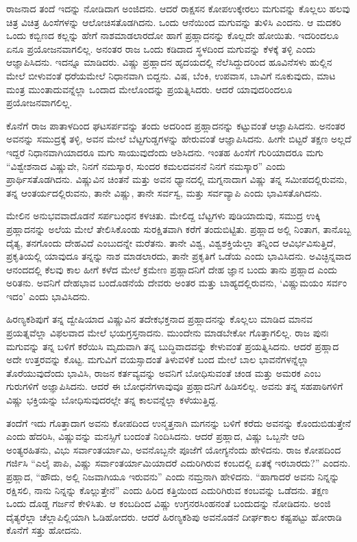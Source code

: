 \vskip 0.3cm

ರಾಜನಾದ ತಂದೆ ಇದನ್ನು ನೋಡಿದಾಗ ಅಂಜಿದನು. ಆದರೆ ರಾಕ್ಷಸನ ಕೋಪ\break ಉಕ್ಕೇರಲು ಮಗುವನ್ನು ಕೊಲ್ಲಲು ಹಲವು ಚಿತ್ರ ವಿಚಿತ್ರ ಹಿಂಸೆಗಳನ್ನು ಆಲೋಚಿಸತೊಡಗಿದನು. ಒಂದು ಆನೆಯಿಂದ ಮಗುವನ್ನು ತುಳಿಸಿ ಎಂದನು. ಆ ಮದಕರಿ ಒಂದು ಕಬ್ಬಿಣದ ಕಲ್ಲನ್ನು ಹೇಗೆ ನಾಶಮಾಡಲಾರದೋ ಹಾಗೆ ಪ್ರಹ್ಲಾದನನ್ನು ಕೊಲ್ಲದೇ ಹೋಯಿತು. ಇದರಿಂದಲೂ ಏನೂ ಪ್ರಯೋಜನವಾಗಲಿಲ್ಲ. ಅನಂತರ ರಾಜ ಒಂದು ಕಡಿದಾದ ಸ್ಥಳದಿಂದ ಮಗುವನ್ನು ಕೆಳಕ್ಕೆ ತಳ್ಳಿ ಎಂದು ಆಜ್ಞಾಪಿಸಿದನು. ಇದನ್ನೂ ಮಾಡಿದರು. ವಿಷ್ಣು ಪ್ರಹ್ಲಾದನ ಹೃದಯದಲ್ಲಿ ನೆಲೆಸಿದ್ದುದರಿಂದ ಹೂವಿನೆಸಳು ಹುಲ್ಲಿನ ಮೇಲೆ ಬೀಳುವಂತೆ ಧರೆಯಮೇಲೆ ನಿಧಾನವಾಗಿ ಬಿದ್ದನು. ವಿಷ, ಬೆಂಕಿ, ಉಪವಾಸ, ಬಾವಿಗೆ ನೂಕುವುದು, ಮಾಟ ಮಂತ್ರ ಮುಂತಾದುವನ್ನೆಲ್ಲಾ ಒಂದಾದ ಮೇಲೊಂದನ್ನು ಪ್ರಯತ್ನಿಸಿದರು. ಆದರೆ ಯಾವುದರಿಂದಲೂ ಪ್ರಯೋಜನವಾಗಲಿಲ್ಲ.

\vskip 0.3cm

ಕೊನೆಗೆ ರಾಜ ಪಾತಾಳದಿಂದ ಘಟಸರ್ಪವನ್ನು ತಂದು ಅದರಿಂದ ಪ್ರಹ್ಲಾದನನ್ನು ಕಟ್ಟುವಂತೆ ಆಜ್ಞಾಪಿಸಿದನು. ಅನಂತರ ಅವನನ್ನು ಸಮುದ್ರಕ್ಕೆ ತಳ್ಳಿ, ಅವನ ಮೇಲೆ ಬೆಟ್ಟಗುಡ್ಡಗಳನ್ನು ಹೇರುವಂತೆ ಆಜ್ಞಾಪಿಸಿದನು. ಹೀಗೇ ಬಿಟ್ಟರೆ ತಕ್ಷಣ ಅಲ್ಲದೆ ಇದ್ದರೆ ನಿಧಾನವಾಗಿಯಾದರೂ ಮಗು ಸಾಯುವುದೆಂದು ಆಶಿಸಿದನು. ಇಂತಹ ಹಿಂಸೆಗೆ ಗುರಿಯಾದರೂ ಮಗು “ವಿಶ್ವೇಶನಾದ ವಿಷ್ಣುವೇ, ನಿನಗೆ ನಮಸ್ಕಾರ, ಸುಂದರ ಕಮಲದವನನೆ ನಿನಗೆ ನಮಸ್ಕಾರ” ಎಂದು ಪ್ರಾರ್ಥಿಸತೊಡಗಿದನು. ವಿಷ್ಣುವಿನ ಚಿಂತನೆ ಮತ್ತು ಅವನ ಧ್ಯಾನದಲ್ಲಿ ಮಗ್ನನಾದಾಗ ವಿಷ್ಣು ತನ್ನ ಸಮೀಪದಲ್ಲಿರುವನು, ತನ್ನ ಆಂತರ್ಯದಲ್ಲಿರುವನು, ತಾನೇ ವಿಷ್ಣು, ತಾನೇ ಸರ್ವಸ್ವ, ಮತ್ತು ಸರ್ವವ್ಯಾಪಿ ಎಂದು ಭಾವಿಸತೊಗಿದನು.

ಮೇಲಿನ ಅನುಭವವಾದೊಡನೆ ಸರ್ಪಬಂಧನ ಕಳಚಿತು. ಮೇಲಿದ್ದ ಬೆಟ್ಟಗಳು ಪುಡಿಯಾದುವು, ಸಮುದ್ರ ಉಕ್ಕಿ ಪ್ರಹ್ಲಾದನನ್ನು ಅಲೆಯ ಮೇಲೆ ತೇಲಿಸಿಕೊಂಡು ಸುರಕ್ಷಿತವಾಗಿ ಕರೆಗೆ ತಂದುಬಿಟ್ಟಿತು. ಪ್ರಹ್ಲಾದ ಅಲ್ಲಿ ನಿಂತಾಗ, ತಾನೊಬ್ಬ ದೈತ್ಯ, ತನಗೊಂದು ದೇಹವಿದೆ ಎಂಬುದನ್ನೇ ಮರೆತನು. ತಾನೇ ವಿಶ್ವ, ವಿಶ್ವಶಕ್ತಿಯೆಲ್ಲಾ ತನ್ನಿಂದ ಆವಿರ್ಭವಿಸುತ್ತಿದೆ, ಪ್ರಕೃತಿಯಲ್ಲಿ ಯಾವುದೂ ತನ್ನನ್ನು ನಾಶ ಮಾಡಲಾರದು, ತಾನೇ ಪ್ರಕೃತಿಗೆ ಒಡೆಯ ಎಂದು ಭಾವಿಸಿದನು. ಅವಿಚ್ಛಿನ್ನವಾದ ಆನಂದದಲ್ಲಿ ಕೆಲವು ಕಾಲ ಹೀಗೆ ಕಳೆದ ಮೇಲೆ ಕ್ರಮೇಣ ಪ್ರಹ್ಲಾದನಿಗೆ ದೇಹ ಜ್ಞಾನ ಬಂದು ತಾನು ಪ್ರಹ್ಲಾದ ಎಂದು ಅರಿತನು. ಅವನಿಗೆ ದೇಹಭಾವ ಬಂದೊಡನೆಯೆ ದೇವರು ಅಂತರ ಮತ್ತು ಬಾಹ್ಯದಲ್ಲಿರುವನು, ‘ವಿಷ್ಣುಮಯಂ ಸರ್ವಂ ಇದಂ’ ಎಂದು ಭಾವಿಸಿದನು.

ಹಿರಣ್ಯಕಶಿಪುಗೆ ತನ್ನ ದ್ವೇಷಿಯಾದ ವಿಷ್ಣುವಿನ ತದೇಕಭಕ್ತನಾದ ಪ್ರಹ್ಲಾದನನ್ನು ಕೊಲ್ಲಲು ಮಾಡಿದ ಮಾನವ ಪ್ರಯತ್ನವೆಲ್ಲಾ ವಿಫಲವಾದ ಮೇಲೆ ಭಯಗ್ರಸ್ತನಾದನು. ಮುಂದೇನು ಮಾಡಬೇಕೋ ಗೊತ್ತಾಗಲಿಲ್ಲ. ರಾಜ ಪುನಃ ಮಗುವನ್ನು ತನ್ನ ಬಳಿಗೆ ಕರೆಯಿಸಿ ಮೃದುವಾಗಿ ತನ್ನ ಬುದ್ಧಿವಾದವನ್ನು ಕೇಳುವಂತೆ ಪ್ರಯತ್ನಿಸಿದನು. ಆದರೆ ಪ್ರಹ್ಲಾದ ಅದೇ ಉತ್ತರವನ್ನು ಕೊಟ್ಟ. ಮಗುವಿಗೆ ವಯಸ್ಸಾದಂತೆ ತಿಳುವಳಿಕೆ ಬಂದ ಮೇಲೆ ಬಾಲ ಭಾವನೆಗಳನ್ನೆಲ್ಲಾ ತೊರೆಯುವುದೆಂದು ಭಾವಿಸಿ, ರಾಜನ ಕರ್ತವ್ಯವನ್ನು ಅವನಿಗೆ ಬೋಧಿಸುವಂತೆ ಚಂಡ ಮತ್ತು ಅಮರಕ ಎಂಬ ಗುರುಗಳಿಗೆ ಅಜ್ಞಾಪಿಸಿದನು. ಆದರೆ ಈ ಬೋಧನೆಗಳಾವುವೂ ಪ್ರಹ್ಲಾದನಿಗೆ ಹಿಡಿಸಲಿಲ್ಲ. ಅವನು ತನ್ನ ಸಹಪಾಠಿಗಳಿಗೆ ವಿಷ್ಣು ಭಕ್ತಿಯನ್ನು ಬೋಧಿಸುವುದರಲ್ಲೇ ತನ್ನ ಕಾಲವನ್ನೆಲ್ಲಾ ಕಳೆಯುತ್ತಿದ್ದ.

ತಂದೆಗೆ ಇದು ಗೊತ್ತಾದಾಗ ಅವನು ಕೋಪದಿಂದ ಉನ್ಮತ್ತನಾಗಿ ಮಗನನ್ನು ಬಳಿಗೆ ಕರೆದು ಅವನನ್ನು ಕೊಂದುಬಿಡುತ್ತೇನೆ ಎಂದು ಹೆದರಿಸಿ, ವಿಷ್ಣುವನ್ನು ಮನಸ್ಸಿಗೆ ಬಂದಂತೆ ನಿಂದಿಸಿದನು. ಆದರೆ ಪ್ರಹ್ಲಾದ, ವಿಷ್ಣು ಒಬ್ಬನೇ ಆದಿ ಅಂತ್ಯರಹಿತನು, ವಿಭು ಸರ್ವಾಂತ\break ರ್ಯಾಮಿ, ಅವನೊಬ್ಬನೇ ಪೂಜೆಗೆ ಯೋಗ್ಯನೆಂದು ಹೇಳಿದನು. ರಾಜ ಕೋಪದಿಂದ ಗರ್ಜಿಸಿ “ಎಲೈ ಪಾಪಿ, ವಿಷ್ಣು ಸರ್ವಾಂತರ್ಯಾಮಿಯಾದರೆ ಎದುರಿಗಿರುವ ಕಂಬದಲ್ಲಿ ಏತಕ್ಕೆ ಇರಬಾರದು?” ಎಂದನು. ಪ್ರಹ್ಲಾದ, “ಹೌದು, ಅಲ್ಲಿ ನಿಜವಾಗಿಯೂ ಇರುವನು” ಎಂದು ನಮ್ರನಾಗಿ ಹೇಳಿದನು. “ಹಾಗಾದರೆ ಅವನು ನಿನ್ನನ್ನು ರಕ್ಷಿಸಲಿ, ನಾನು ನಿನ್ನನ್ನು ಕೊಲ್ಲುತ್ತೇನೆ” ಎಂದು ಹಿರಿದ ಕತ್ತಿಯಿಂದ ಎದುರಿಗಿರುವ ಕಂಬವನ್ನು ಒಡೆದನು. ತಕ್ಷಣ ಒಂದು ದೊಡ್ಡ ಗರ್ಜನೆ ಕೇಳಿಸಿತು. ಆ ಕಂಬದಿಂದ ವಿಷ್ಣು ಉಗ್ರನರಸಿಂಹನಂತೆ ಬಂದುದನ್ನು ನೋಡಿದನು. ಅಂಜಿ ದೈತ್ಯರೆಲ್ಲಾ ಚೆಲ್ಲಾಪಿಲ್ಲಿಯಾಗಿ ಓಡಿಹೋದರು. ಆದರೆ ಹಿರಣ್ಯಕಶಿಪು ಅವನೊಡನೆ ದೀರ್ಘಕಾಲ ಕಷ್ಟಪಟ್ಟು ಹೋರಾಡಿ ಕೊನೆಗೆ ಸತ್ತು ಹೋದನು.


